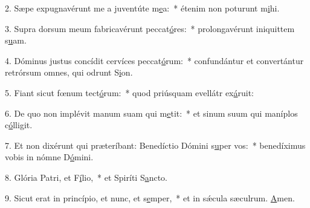 2. Sæpe expugnavérunt me a juventúte m\uline{e}a:~* étenim non poturunt m\uline{i}hi.\par 
3. Supra dorsum meum fabricavérunt peccat\uline{ó}res:~* prolongavérunt iniquittem s\uline{u}am.\par 
4. Dóminus justus concídit cervíces peccat\uline{ó}rum:~* confundántur et convertántur retrórsum omnes, qui odrunt S\uline{i}on.\par 
5. Fiant sicut fœnum tect\uline{ó}rum:~* quod priúsquam evellátr ex\uline{á}ruit:\par 
6. De quo non implévit manum suam qui m\uline{e}tit:~* et sinum suum qui maníplos c\uline{ó}lligit.\par 
7. Et non dixérunt qui præteríbant: Benedíctio Dómini s\uline{u}per vos:~* benedíximus vobis in nómne D\uline{ó}mini.\par 
8. Glória Patri, et F\uline{í}lio,~* et Spiríti S\uline{a}ncto.\par 
9. Sicut erat in princípio, et nunc, et s\uline{e}mper,~* et in sǽcula sæculrum. \uline{A}men.\par 
